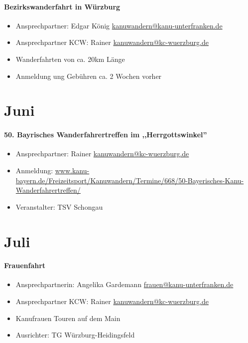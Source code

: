\documentclass[12pt, a4paper]{report}
\begin{document}
\paragraph{Bezirkswanderfahrt in Würzburg}
\begin{itemize}
    \item Ansprechpartner: Edgar König \href{mailto:kanuwandern@kanu-unterfranken.de}{kanuwandern@kanu-unterfranken.de}
    \item Ansprechpartner KCW: Rainer \href{mailto:kanuwandern@kc-wuerzburg.de}{kanuwandern@kc-wuerzburg.de}
    \item Wanderfahrten von ca. 20km Länge
    \item Anmeldung ung Gebühren ca. 2 Wochen vorher
\end{itemize}

\section*{Juni}\paragraph{50. Bayrisches Wanderfahrertreffen im ,,Herrgottswinkel''}
\begin{itemize}
    \item Ansprechpartner: Rainer \href{mailto:kanuwandern@kc-wuerzburg.de}{kanuwandern@kc-wuerzburg.de}
    \item Anmeldung: \url{www.kanu-bayern.de/Freizeitsport/Kanuwandern/Termine/668/50-Bayerisches-Kanu-Wanderfahrertreffen/}
    \item Veranstalter: TSV Schongau
\end{itemize}

\section*{Juli}\paragraph{Frauenfahrt}
\begin{itemize}
    \item Ansprechpartnerin: Angelika Gardemann \href{mailto:frauen@kanu-unterfranken.de}{frauen@kanu-unterfranken.de}
    \item Ansprechpartner KCW: Rainer \href{mailto:kanuwandern@kc-wuerzburg.de}{kanuwandern@kc-wuerzburg.de}
    \item Kanufrauen Touren auf dem Main
    \item Ausrichter: TG Würzburg-Heidingsfeld
\end{itemize}
\end{document}
